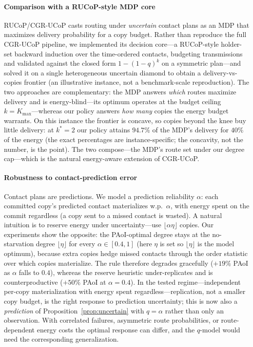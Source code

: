 \documentclass[twocolumn,3p,times,procedia]{elsarticle}
\begin{document}
\paragraph*{Comparison with a RUCoP-style MDP core}
RUCoP/CGR-UCoP casts routing under \emph{uncertain} contact plans as an
MDP that maximizes delivery probability for a copy budget. Rather than
reproduce the full CGR-UCoP pipeline, we implemented its decision core---a
RUCoP-style holder-set backward induction over the time-ordered contacts,
budgeting transmissions and validated against the closed form $1-(1-q)^k$
on a symmetric plan---and solved it on a single heterogeneous uncertain
diamond to obtain a delivery-vs-copies frontier (an illustrative
instance, not a benchmark-scale reproduction). The two approaches are
complementary: the MDP answers \emph{which} routes maximize delivery and
is energy-blind---its optimum operates at the budget ceiling
$k{=}K_{\max}$---whereas our policy answers \emph{how many} copies the
energy budget warrants. On this instance the frontier is concave, so
copies beyond the knee buy little delivery: at $k^\ast{=}2$ our policy
attains $94.7\%$ of the MDP's delivery for $40\%$ of the energy (the exact
percentages are instance-specific; the concavity, not the number, is the
point). The two compose---the MDP's route set under our degree cap---which
is the natural energy-aware extension of CGR-UCoP.

\paragraph*{Robustness to contact-prediction error}
Contact plans are predictions. We model a prediction reliability
$\alpha$: each committed copy's predicted contact materializes w.p.\
$\alpha$, with energy spent on the commit regardless (a copy sent to a
missed contact is wasted). A natural intuition is to reserve energy under
uncertainty---use $\lfloor\alpha\eta\rfloor$ copies. Our experiments show
the opposite: the PAoI-optimal degree stays at the
no-starvation degree $\lfloor\eta\rfloor$ for every $\alpha\in[0.4,1]$
(here $\eta$ is set so $\lfloor\eta\rfloor$ is the model optimum), because
extra copies hedge missed contacts through the order statistic over which
copies materialize. The rule therefore degrades gracefully ($+19\%$ PAoI
as $\alpha$ falls to $0.4$), whereas the reserve heuristic
under-replicates and is counterproductive ($+50\%$ PAoI at $\alpha{=}0.4$).
In the tested regime---independent per-copy materialization with energy
spent regardless---replication, not a smaller copy budget, is the right
response to prediction uncertainty; this is now also a \emph{prediction}
of Proposition~\ref{prop:uncertain} with $q{=}\alpha$ rather than only
an observation. With correlated failures, asymmetric route
probabilities, or route-dependent energy costs the optimal response can
differ, and the $q$-model would need the corresponding generalization.
\end{document}
